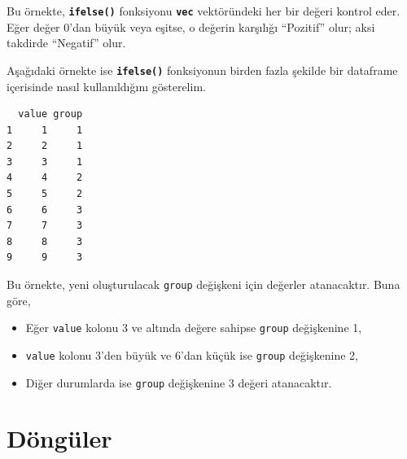 \documentclass[
  letterpaper,
  DIV=11,
  numbers=noendperiod]{scrreprt}
\newenvironment{Shaded}{\begin{snugshade}}{\end{snugshade}}
\newcommand{\AttributeTok}[1]{\textcolor[rgb]{0.40,0.45,0.13}{#1}}
\newcommand{\DecValTok}[1]{\textcolor[rgb]{0.68,0.00,0.00}{#1}}
\newcommand{\FunctionTok}[1]{\textcolor[rgb]{0.28,0.35,0.67}{#1}}
\newcommand{\NormalTok}[1]{\textcolor[rgb]{0.00,0.23,0.31}{#1}}
\newcommand{\OtherTok}[1]{\textcolor[rgb]{0.00,0.23,0.31}{#1}}
\newcommand{\SpecialCharTok}[1]{\textcolor[rgb]{0.37,0.37,0.37}{#1}}
\begin{document}
Bu örnekte, \textbf{\texttt{ifelse()}} fonksiyonu \textbf{\texttt{vec}}
vektöründeki her bir değeri kontrol eder. Eğer değer 0'dan büyük veya
eşitse, o değerin karşılığı ``Pozitif'' olur; aksi takdirde ``Negatif''
olur.

Aşağıdaki örnekte ise \textbf{\texttt{ifelse()}} fonksiyonun birden
fazla şekilde bir dataframe içerisinde nasıl kullanıldığını gösterelim.

\begin{Shaded}
\end{Shaded}

\begin{verbatim}
  value group
1     1     1
2     2     1
3     3     1
4     4     2
5     5     2
6     6     3
7     7     3
8     8     3
9     9     3
\end{verbatim}

Bu örnekte, yeni oluşturulacak \texttt{group} değişkeni için değerler
atanacaktır. Buna göre,

\begin{itemize}
\item
  Eğer \texttt{value} kolonu 3 ve altında değere sahipse \texttt{group}
  değişkenine 1,
\item
  \texttt{value} kolonu 3'den büyük ve 6'dan küçük ise \texttt{group}
  değişkenine 2,
\item
  Diğer durumlarda ise \texttt{group} değişkenine 3 değeri atanacaktır.
\end{itemize}

\hypertarget{duxf6nguxfcler}{%
\section{Döngüler}\label{duxf6nguxfcler}}
\end{document}
